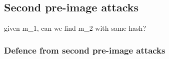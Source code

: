 
\subsection{Second pre-image attacks}

given m_1, can we find m_2 with same hash?

\subsubsection{Defence from second pre-image attacks}

